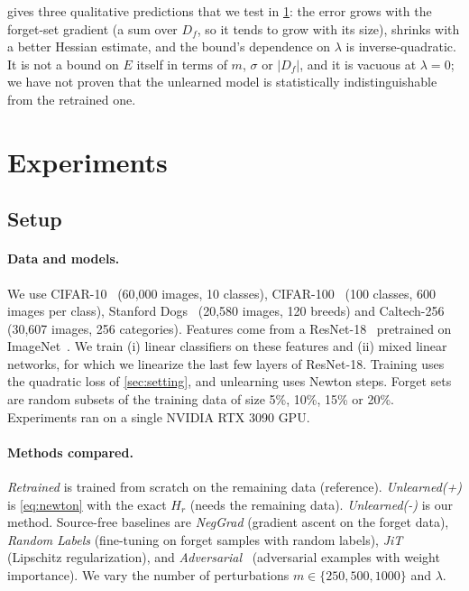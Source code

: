 \documentclass[10pt,twocolumn,letterpaper]{article}
\begin{document}
 gives three qualitative predictions that we test in \cref{sec:experiments}: the error grows with the forget-set gradient (a sum over $D_f$, so it tends to grow with its size), shrinks with a better Hessian estimate, and the bound's dependence on $\lambda$ is inverse-quadratic.
It is not a bound on $E$ itself in terms of $m$, $\sigma$ or $|D_f|$, and it is vacuous at $\lambda=0$; we have not proven that the unlearned model is statistically indistinguishable from the retrained one.

\section{Experiments}
\label{sec:experiments}
\subsection{Setup}
\label{sec:setup}
\paragraph{Data and models.}
We use CIFAR-10~\cite{krizhevsky2009learning} (60{,}000 images, 10 classes), CIFAR-100~\cite{krizhevsky2009learning} (100 classes, 600 images per class), Stanford Dogs~\cite{khosla2011novel} (20{,}580 images, 120 breeds) and Caltech-256~\cite{griffin2007caltech} (30{,}607 images, 256 categories).
Features come from a ResNet-18~\cite{he2016deep} pretrained on ImageNet~\cite{deng2009imagenet}.
We train (i) linear classifiers on these features and (ii) mixed linear networks, for which we linearize the last few layers of ResNet-18.
Training uses the quadratic loss of \cref{sec:setting}, and unlearning uses Newton steps.
Forget sets are random subsets of the training data of size 5\%, 10\%, 15\% or 20\%.
Experiments ran on a single NVIDIA RTX 3090 GPU.

\paragraph{Methods compared.}
\emph{Retrained} is trained from scratch on the remaining data (reference).
\emph{Unlearned(+)} is \cref{eq:newton} with the exact $H_r$ (needs the remaining data).
\emph{Unlearned(-)} is our method.
Source-free baselines are \emph{NegGrad} (gradient ascent on the forget data), \emph{Random Labels} (fine-tuning on forget samples with random labels), \emph{JiT}~\cite{foster2024information} (Lipschitz regularization), and \emph{Adversarial}~\cite{cha2024learning} (adversarial examples with weight importance).
We vary the number of perturbations $m\in\{250,500,1000\}$ and $\lambda$.
\end{document}
